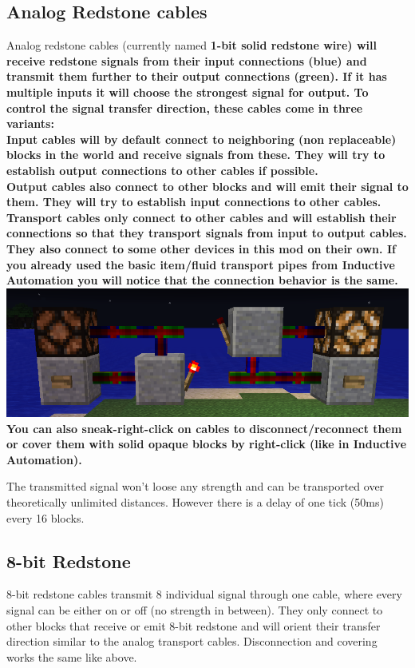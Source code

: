 \documentclass[11pt]{article} %
\begin{document}
\subsection{Analog Redstone cables}
Analog redstone cables (currently named \bf 1-bit solid redstone wire\rm) will receive redstone signals from their input connections (blue) and transmit them further to their output connections (green). If it has multiple inputs it will choose the strongest signal for output. To control the signal transfer direction, these cables come in three variants:\\
\bf Input cables \rm will by default connect to neighboring (non replaceable) blocks in the world and receive signals from these. They will try to establish output connections to other cables if possible.\\
\bf Output cables \rm also connect to other blocks and will emit their signal to them. They will try to establish input connections to other cables.\\
\bf Transport cables \rm only connect to other cables and will establish their connections so that they transport signals from input to output cables. They also connect to some other devices in this mod on their own. If you already used the basic item/fluid transport pipes from \bf Inductive Automation \rm you will notice that the connection behavior is the same.\\
\includegraphics[width=\textwidth]{1_bit_pipes}\\
You can also sneak-right-click on cables to disconnect/reconnect them or cover them with solid opaque blocks by right-click (like in Inductive Automation).

The transmitted signal won't loose any strength and can be transported over theoretically unlimited distances. However there is a delay of one tick (50ms) every 16 blocks.

\subsection{8-bit Redstone}
8-bit redstone cables transmit 8 individual signal through one cable, where every signal can be either on or off (no strength in between). They only connect to other blocks that receive or emit  8-bit redstone and will orient their transfer direction similar to the analog transport cables. Disconnection and covering works the same like above.\\
\end{document}
